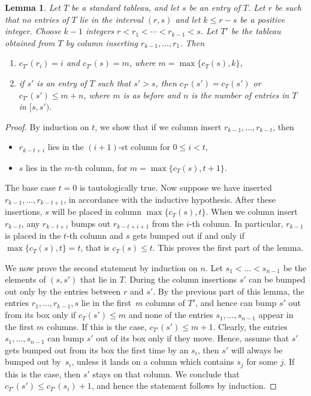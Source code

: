 \documentclass[10pt,a4paper]{amsart}
\numberwithin{equation}{section}
\newtheorem{Lemma}[Theorem]{Lemma}
\begin{document}
\begin{Lemma}\label{lem:2.2}
Let $T$ be a standard tableau, and let $s$ be an entry of $T$. Let $r$ be such that no entries of $T$ lie in the interval $(r,s)$ and let $k\leq r-s$ be a positive integer. Choose $k-1$ integers $r<r_1<\cdots<r_{k-1}<s$. Let $T'$ be the tableau obtained from $T$ by column inserting $r_{k-1},\dots,r_1$. Then
\begin{enumerate}\itemsep=0pt
\item[$1)$] $c_{T'}(r_i)=i$ and $c_{T'}(s)=m$, where $m=\max\{c_T(s),k\}$,
\item[$2)$] if $s'$ is an entry of $T$ such that $s'>s$, then $c_{T'}(s')=c_T(s')$ or $c_{T'}(s')\leq m+n$, where $m$ is as before and $n$ is the number of entries in $T$ in $[s,s')$.
\end{enumerate}
\end{Lemma}
\begin{proof}
 By induction on $t$, we show that if we column insert $r_{k-1}, \dots, r_{k-t}$, then
\begin{itemize}\itemsep=0pt
\item $r_{k-t+i}$ lies in the $(i+1)$-st column for $0\leq i<t$,
\item $s$ lies in the $m$-th column, for $m=\max\{c_T(s),t+1\}$.
\end{itemize}
The base case $t=0$ is tautologically true. Now suppose we have inserted $r_{k-1}, \dots, r_{k-t+1}$, in accordance with the inductive hypothesis. After these insertions, $s$ will be placed in column $\max\{c_T(s),t\}$. When we column insert $r_{k-t}$, any $r_{k-t+i}$ bumps out $r_{k-t+i+1}$ from the $i$-th column. In particular, $r_{k-1}$ is placed in the $t$-th column and $s$ gets bumped out if and only if $\max\{c_T(s),t\}=t$, that is $c_T(s)\leq t$. This proves the first part of the lemma.


 We now prove the second statement by induction on $n$. Let $s_1<\dots<s_{n-1}$ be the elements of $(s,s')$ that lie in $T$.
 During the column insertions $s'$ can be bumped out only by the entries between $r$ and $s'$. By the previous part of this lemma, the entries $r_1, \dots,r_{k-1}, s$ lie in the first~$m$ columns of $T'$, and hence can bump $s'$ out from its box only if $c_{T}(s')\leq m$ and none of the entries $s_1, \dots, s_{n-1}$ appear in the first $m$ columns. If this is the case, $c_{T'}(s')\leq m+1$. Clearly, the entries $s_1,\dots,s_{n-1}$ can bump $s'$ out of its box only if they move. Hence, assume that $s'$ gets bumped out from its box the first time by an $s_i$, then $s'$ will always be bumped out by~$s_i$, unless it lands on a column which contains $s_j$ for some $j$. If this is the case, then $s'$ stays on that column. We conclude that $c_{T'}(s')\leq c_{T'}(s_{i})+1$, and hence the statement follows by induction.
\end{proof}
\end{document}
